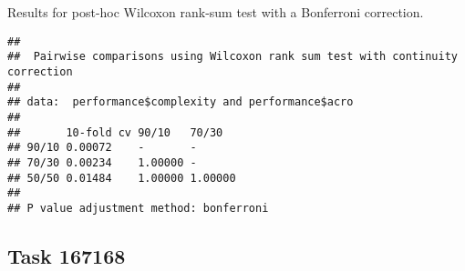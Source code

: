\documentclass[
]{book}
\newenvironment{Shaded}{\begin{snugshade}}{\end{snugshade}}
\newcommand{\AttributeTok}[1]{\textcolor[rgb]{0.13,0.29,0.53}{#1}}
\newcommand{\ConstantTok}[1]{\textcolor[rgb]{0.56,0.35,0.01}{#1}}
\newcommand{\FunctionTok}[1]{\textcolor[rgb]{0.13,0.29,0.53}{\textbf{#1}}}
\newcommand{\NormalTok}[1]{#1}
\newcommand{\SpecialCharTok}[1]{\textcolor[rgb]{0.81,0.36,0.00}{\textbf{#1}}}
\newcommand{\StringTok}[1]{\textcolor[rgb]{0.31,0.60,0.02}{#1}}
\begin{document}
Results for post-hoc Wilcoxon rank-sum test with a Bonferroni correction.

\begin{Shaded}
\end{Shaded}

\begin{verbatim}
## 
##  Pairwise comparisons using Wilcoxon rank sum test with continuity correction 
## 
## data:  performance$complexity and performance$acro 
## 
##       10-fold cv 90/10   70/30  
## 90/10 0.00072    -       -      
## 70/30 0.00234    1.00000 -      
## 50/50 0.01484    1.00000 1.00000
## 
## P value adjustment method: bonferroni
\end{verbatim}

\hypertarget{task-167168-1}{%
\subsection{Task 167168}\label{task-167168-1}}
\end{document}

